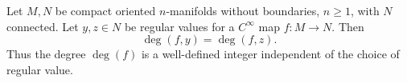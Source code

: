Let $M, N$ be compact oriented $n$-manifolds without boundaries, $n \geqslant 1$, with $N$ connected. Let $y, z \in N$ be regular values for a $C^\infty$ map $f: M \to N$. Then
$$
\deg(f, y) = \deg(f, z).
$$
Thus the degree $\deg(f)$ is a well-defined integer independent of the choice of regular value.
